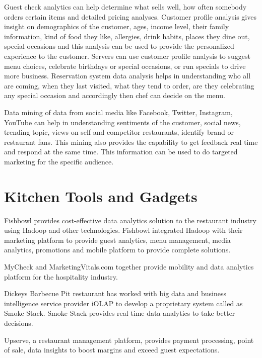 \documentclass[sigconf]{acmart}
\begin{document}
Guest check analytics can help determine what sells well, how often somebody orders certain items and detailed pricing analyses\cite{www-restaurant}. 
Customer profile analysis gives insight on demographics of the customer, ages, income level, their family information, kind of food they like, allergies, drink habits, places they dine out, special occasions and this analysis can be used to provide the personalized experience to the customer\cite{www-restaurant}. Servers can use customer profile analysis to suggest menu choices, celebrate birthdays or special occasions, or run specials to drive more business. Reservation system data analysis helps in understanding who all are coming, when they last visited, what they tend to order, are they celebrating any special occasion and accordingly then chef can decide on the menu\cite{www-bostonglobe}. 

Data mining of data from social media like Facebook, Twitter, Instagram, YouTube can help in understanding sentiments of the customer, social news, trending topic, views on self and competitor restaurants, identify brand or restaurant fans\cite{JENNINGSLISA2015Mbds}. This mining also provides the capability to get feedback real time and respond at the same time. This information can be used to do targeted marketing for the specific audience\cite{JENNINGSLISA2015Mbds}. 

\section{Kitchen Tools and Gadgets}
Fishbowl provides cost-effective data analytics solution to the restaurant industry using Hadoop and other technologies. Fishbowl integrated Hadoop with their marketing platform to provide guest analytics, menu management, media analytics, promotions and mobile platform to provide complete solutions\cite{www-foodnewsfeed}\cite{www-fishbowl}.  

MyCheck and MarketingVitals.com together provide mobility and data analytics platform for the hospitality industry\cite{www-buss}. 

Dickeys Barbecue Pit restaurant has worked with big data and business intelligence service provider iOLAP to develop a proprietary system called as Smoke Stack. Smoke Stack provides real time data analytics to take better decisions\cite{www-forbes}.

Upserve, a restaurant management platform, provides payment processing, point of sale, data insights to boost margins and exceed guest expectations\cite{www-bostonglobe}\cite{www-upserve}.
\end{document}
